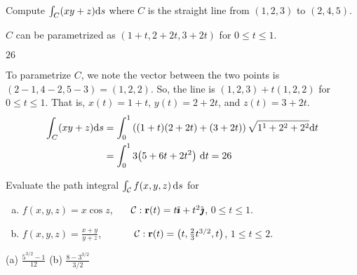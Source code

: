 \begin{question}
	Compute $\int_C (xy+z) \mathrm{d}s$ where $C$ is the straight line from $(1,2,3)$ to $(2,4,5)$.
\end{question}
\begin{hint}
	$C$ can be parametrized as $(1+t,2+2t,3+2t)$ for $0 \le t \le 1$.
\end{hint}
\begin{answer}
	$26$
\end{answer}
\begin{solution}
	To parametrize $C$, we note the vector between the two points is $(2-1,4-2,5-3)=(1,2,2)$. So, the line is $(1,2,3)+t(1,2,2)$ for $0 \le t \le 1$. That is, $x(t)=1+t$, $y(t)=2+2t$, and $z(t)=3+2t$.
	\begin{align*}
		\int_C(xy+z)\dee{s}&=\int_0^1 \left((1+t)(2+2t)+(3+2t)\right)\sqrt{1^1+2^2+2^2}\dee{t}\\
		&=              \int_0^1 3\big(5 + 6t + 2t^2\big)\ \dee{t}=26
		\end{align*}
\end{solution}


\begin{question}
Evaluate the path integral $\int_{\mathcal{C}} f(x,y,z)\,\mathrm{d}s$ for
\begin{enumerate}[(a)]
\item 
$f(x,y,z)=x\cos z$, \ \ \ $\mathcal{C}:\mathbf{r}(t)=t\hat{\pmb{\imath}}+t^2\hat{\pmb{\jmath}}$,
$0\le t\le 1$.

\item $f(x,y,z)=\frac{x+y}{y+z}$, \ \ \ \ \ \ 
$\mathcal{C}:\mathbf{r}(t)= \big(t,\frac{2}{3}t^{3/2},t\big)$,
$1\le t\le 2$.	
\end{enumerate}
\end{question}


\begin{answer}
(a) $\frac{5^{3/2}-1}{12}$\qquad
(b) $\frac{8-3^{3/2}}{3/2}$	
\end{answer}


